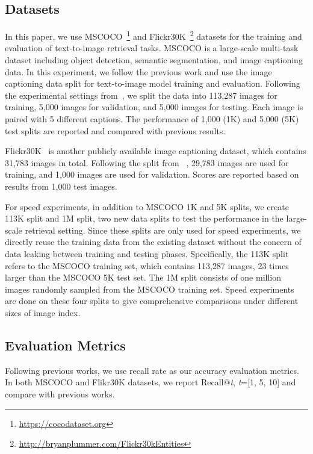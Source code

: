 \subsection{Datasets}
In this paper, we use MSCOCO~\cite{lin2014microsoft}\footnote{\url{https://cocodataset.org}} and Flickr30K~\cite{plummer2015flickr30k}\footnote{\url{http://bryanplummer.com/Flickr30kEntities}} datasets for the training and evaluation of text-to-image retrieval tasks. MSCOCO is a large-scale multi-task dataset including object detection, semantic segmentation, and image captioning data. In this experiment, we follow the previous work and use the image captioning data split for text-to-image model training and evaluation. Following the experimental settings from~\citet{karpathy2015deep}, we split the data into 113,287 images for training, 5,000 images for validation, and 5,000 images for testing. Each image is paired with 5 different captions. The performance of 1,000 (1K) and 5,000 (5K) test splits are reported and compared with previous results.

Flickr30K~\cite{plummer2015flickr30k} is another publicly available image captioning dataset, which contains 31,783 images in total. Following the split from ~\citet{karpathy2015deep}, 29,783 images are used for training, and 1,000 images are used for validation. Scores are reported based on results from 1,000 test images. 

For speed experiments, in addition to MSCOCO 1K and 5K splits, we create 113K split and 1M split, two new data splits to test the performance in the large-scale retrieval setting. Since these splits are only used for speed experiments, we directly reuse the training data from the existing dataset without the concern of data leaking between training and testing phases. Specifically, the 113K split refers to the MSCOCO training set, which contains 113,287 images, 23 times larger than the MSCOCO 5K test set. The 1M split consists of one million images randomly sampled from the MSCOCO training set. Speed experiments are done on these four splits to give comprehensive comparisons under different sizes of image index.


\subsection{Evaluation Metrics}
\label{sec:visualsparta-metrics}
Following previous works, we use recall rate as our accuracy evaluation metrics. In both MSCOCO and Flikr30K datasets, we report Recall@\textit{t}, \textit{t}=[1, 5, 10] and compare with previous works. 

